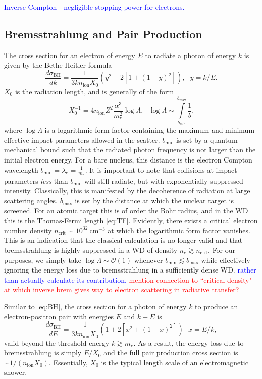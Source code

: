\documentclass[twocolumn,showpacs,preprintnumbers,amsmath,amssymb,prd]{revtex4}
\newcommand{\OO}{\mathcal{O}}
\begin{document}
\begin{appendices}
\textcolor{blue}{Inverse Compton - negligible stopping power for electrons.}

\subsection*{Bremsstrahlung and Pair Production}
The cross section for an electron of energy $E$ to radiate a photon of energy $k$ is given by the Bethe-Heitler formula
\begin{equation}
\label{eq:BH}
\frac{d \sigma_\text{BH}}{dk} = \frac{1}{3 k n_\text{ion} X_0} (y^2+2 [1+ (1-y)^2]), ~~~ y = k/E.
\end{equation}
$X_0$ is the radiation length, and is generally of the form
\begin{equation}
X_0^{-1} = 4 n_\text{ion} Z^2 \frac{\alpha^3}{m_e^2} \log{\Lambda}, ~~~ \log{\Lambda} \sim \int \limits_{b_\text{min}}^{b_\text{max}} \frac{1}{b}.
\end{equation}
where $\log{\Lambda}$ is a logarithmic form factor containing the maximum and minimum effective impact parameters allowed in the scatter. $b_\text{min}$ is set by a quantum-mechanical bound such that the radiated photon frequency is not larger than the initial electron energy. For a bare nucleus, this distance is the electron Compton wavelength $b_\text{min} = \lambda_e = \frac{1}{m_e}$. It is important to note that collisions at impact parameters \emph{less} than $b_\text{min}$ will still radiate, but with exponentially suppressed intensity. Classically, this is manifested by the decoherence of radiation at large scattering angles. $b_\text{max}$ is set by the distance at which the nuclear target is screened. For an atomic target this is of order the Bohr radius, and in the WD this is the Thomas-Fermi length \eqref{eq:TF}. Evidently, there exists a critical electron number density $n_\text{crit} \sim 10^{32} ~\text{cm}^{-3}$ at which the logarithmic form factor vanishes. This is an indication that the classical calculation is no longer valid and that bremsstrahlung is highly suppressed in a WD of density $n_e \gtrsim n_\text{crit}$. For our purposes, we simply take $\log{\Lambda} \sim \OO(1)$ whenever $b_\text{min} \lesssim b_\text{max}$ while effectively ignoring the energy loss due to bremsstrahlung in a sufficiently dense WD. \textcolor{blue}{rather than actually calculate its contribution.} \textcolor{red}{mention connection to ``critical density" at which inverse brem gives way to electron scattering in radiative transfer?}

Similar to \eqref{eq:BH}, the cross section for a photon of energy $k$ to produce an electron-positron pair with energies $E$ and $k-E$ is
\begin{equation}
\label{eq:PP}
\frac{d \sigma_\text{BH}}{dE} = \frac{1}{3 k n_\text{ion} X_0} (1+ 2[x^2+ (1-x)^2]) ~~~ x = E/k,
\end{equation}
valid beyond the threshold energy $k \gtrsim m_e$. As a result, the energy loss due to bremsstrahlung is simply $E/X_0$ and the full pair production cross section is $\sim 1/(n_\text{ion} X_0)$. Essentially, $X_0$ is the typical length scale of an electromagnetic shower.


\end{appendices}
\end{document}
